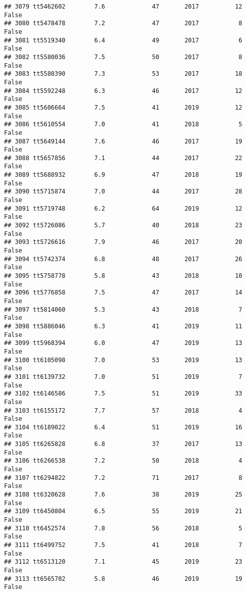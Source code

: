 \documentclass[
]{article}
\begin{document}
\begin{verbatim}
## 3079 tt5462602        7.6             47       2017          12   False
## 3080 tt5478478        7.2             47       2017           8   False
## 3081 tt5519340        6.4             49       2017           6   False
## 3082 tt5580036        7.5             50       2017           8   False
## 3083 tt5580390        7.3             53       2017          18   False
## 3084 tt5592248        6.3             46       2017          12   False
## 3085 tt5606664        7.5             41       2019          12   False
## 3086 tt5610554        7.0             41       2018           5   False
## 3087 tt5649144        7.6             46       2017          19   False
## 3088 tt5657856        7.1             44       2017          22   False
## 3089 tt5688932        6.9             47       2018          19   False
## 3090 tt5715874        7.0             44       2017          28   False
## 3091 tt5719748        6.2             64       2019          12   False
## 3092 tt5726086        5.7             40       2018          23   False
## 3093 tt5726616        7.9             46       2017          20   False
## 3094 tt5742374        6.8             48       2017          26   False
## 3095 tt5758778        5.8             43       2018          10   False
## 3096 tt5776858        7.5             47       2017          14   False
## 3097 tt5814060        5.3             43       2018           7   False
## 3098 tt5886046        6.3             41       2019          11   False
## 3099 tt5968394        6.0             47       2019          13   False
## 3100 tt6105098        7.0             53       2019          13   False
## 3101 tt6139732        7.0             51       2019           7   False
## 3102 tt6146586        7.5             51       2019          33   False
## 3103 tt6155172        7.7             57       2018           4   False
## 3104 tt6189022        6.4             51       2019          16   False
## 3105 tt6265828        6.8             37       2017          13   False
## 3106 tt6266538        7.2             50       2018           4   False
## 3107 tt6294822        7.2             71       2017           8   False
## 3108 tt6320628        7.6             38       2019          25   False
## 3109 tt6450804        6.5             55       2019          21   False
## 3110 tt6452574        7.8             56       2018           5   False
## 3111 tt6499752        7.5             41       2018           7   False
## 3112 tt6513120        7.1             45       2019          23   False
## 3113 tt6565702        5.8             46       2019          19   False

\end{verbatim}
\end{document}
